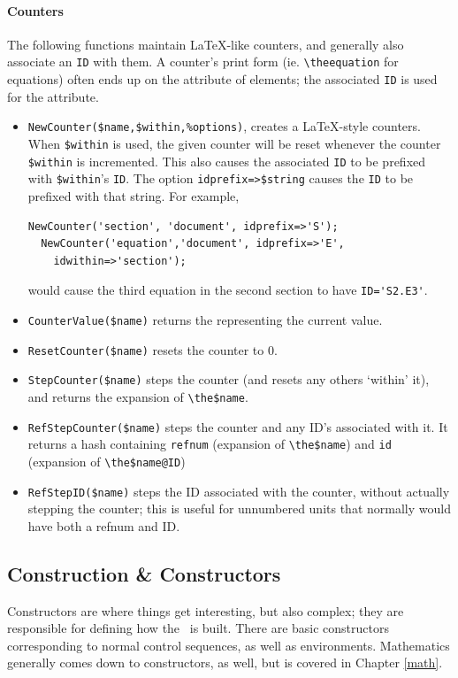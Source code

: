 \documentclass{book}
\newcommand{\ltxcode}{\lstinline[style=latexml]}
\newcommand{\xmlcode}{\lstinline[style=xml]}
\begin{document}
\paragraph{Counters}
The following functions maintain \LaTeX-like counters, and generally
also associate an \texttt{ID} with them.  A counter's print form
(ie. \verb|\theequation| for equations) often ends up on the  attribute
of elements; the associated \texttt{ID} is used for the  attribute.
\begin{itemize}
\item \ltxcode|NewCounter($name,$within,%
  creates a \LaTeX-style counters.  When \ltxcode|$within| is used, 
  the given counter will be reset whenever the counter \ltxcode|$within| is incremented.
  This also causes the associated \texttt{ID} to be prefixed with \ltxcode|$within|'s \texttt{ID}.
  The option \ltxcode|idprefix=>$string| causes the \texttt{ID} to be prefixed with that string.
  For example,
\begin{lstlisting}[style=latexml]
  NewCounter('section', 'document', idprefix=>'S');
  NewCounter('equation','document', idprefix=>'E',
    idwithin=>'section');
\end{lstlisting}
would cause the third equation in the second section to have \xmlcode{ID='S2.E3'}.
\item  \ltxcode|CounterValue($name)| returns the  representing the current value.
\item  \ltxcode|ResetCounter($name)| resets the counter to 0.
\item \ltxcode|StepCounter($name)| steps the counter (and resets any others `within' it),
  and returns the expansion of \verb|\the$name|.
\item \ltxcode|RefStepCounter($name)| steps the counter and any ID's associated with it.
  It returns a hash containing \texttt{refnum} (expansion of \verb|\the$name|)
  and \texttt{id} (expansion of \verb|\the$name@ID|)
\item \ltxcode|RefStepID($name)| steps the ID associated with the counter, without
  actually stepping the counter; this is useful for unnumbered units that normally
  would have both a refnum and ID.
\end{itemize}

\subsection[Construction]{Construction \& Constructors}\label{customization.latexml.construction}
Constructors are where things get interesting, but also complex; they are
responsible for defining how the \XML\ is built.  There are basic
constructors corresponding to normal control sequences, as well as
environments. Mathematics generally comes down to constructors, as well,
but is covered in Chapter \ref{math}.
\end{document}
